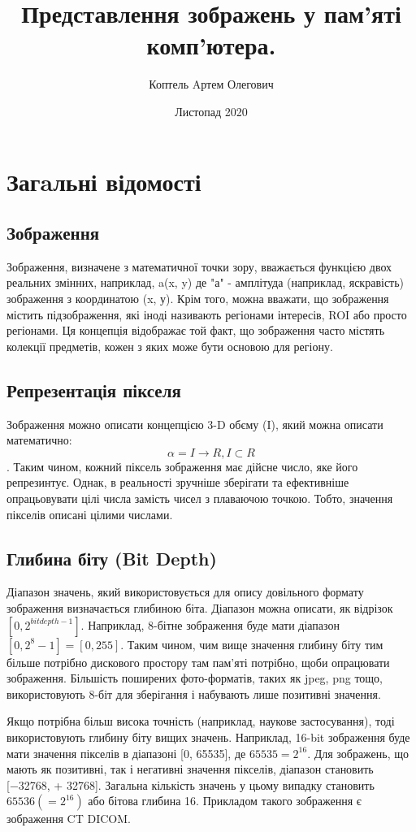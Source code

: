 \documentclass[11pt]{article}
\title{Представлення зображень у пам’яті комп’ютера.}
\author{Коптель Aртем Олегович}
\date{Листопад 2020}
\begin{document}
    \section{Загaльні відомості}\label{sec:general_info}

    \subsection{Зображення}\label{subsec:image_representation}
    Зображення, визначене з математичної точки зору, вважається функцією двох реальних змінних, наприклад, a(x, y) де "а" - амплітуда (наприклад, яскравість) зображення з координатою (x, у).
    Крім того, можна вважати, що зображення містить підзображення, які іноді називають регіонами інтересів, ROI або просто регіонами.
    Ця концепція відображає той факт, що зображення часто містять колекції предметів, кожен з яких може бути основою для регіону.

    \subsection{Репрезентація пікселя}\label{subsec:pixel_definition}
    Зображення можно описати концепцією 3-D обєму (I), який можна описати математично:
    \[ \alpha = I \rightarrow R, I \subset R \].
    Таким чином, кожний піксель зображення має дійсне число, яке його репрезинтує.
    Однак, в реальності зручніше зберігати та ефективніше опрацьовувати цілі числа замість чисел з плаваючою точкою.
    Тобто, значення пікселів описані цілими числами.

    \subsection{Глибина біту (Bit Depth)}\label{subsec:bit_depth}
    Діапазон значень, який використовується для опису довільного формату зображення визначається глибиною біта.
    Діапазон можна описати, як відрізок \([0, 2^{bitdepth - 1}]\).
    Наприклад, 8-бітне зображення буде мати діапазон \([0, 2^{8} - 1] = [0, 255]\).
    Таким чином, чим вище значення глибину біту тим більше потрібно дискового простору там пам'яті потрібно, щоби опрацювати зображення.
    Більшість поширених фото-форматів, таких як jpeg, png тощо, використовують 8-біт для зберігання і набувають лише позитивні значення.

    Якщо потрібна більш висока точність (наприклад, наукове застосування), тоді використовують глибину біту вищих значень.
    Наприклад, 16-bit зображення буде мати значення пікселів в діапазоні [0, 65535], де  \(65535 = 2^{16}\).
    Для зображень, що мають як позитивні, так і негативні значення пікселів, діапазон становить [−32768, + 32768].
    Загальна кількість значень у цьому випадку становить \(65536(=2^{16})\) або бітова глибина 16.
    Прикладом такого зображення є зображення CT DICOM.
\end{document}
